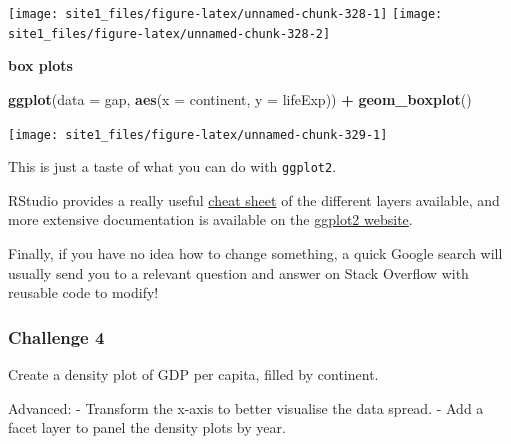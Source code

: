 \documentclass[]{book}
\newenvironment{Shaded}{\begin{snugshade}}{\end{snugshade}}
\newcommand{\KeywordTok}[1]{\textcolor[rgb]{0.13,0.29,0.53}{\textbf{#1}}}
\newcommand{\DataTypeTok}[1]{\textcolor[rgb]{0.13,0.29,0.53}{#1}}
\newcommand{\StringTok}[1]{\textcolor[rgb]{0.31,0.60,0.02}{#1}}
\newcommand{\OperatorTok}[1]{\textcolor[rgb]{0.81,0.36,0.00}{\textbf{#1}}}
\newcommand{\NormalTok}[1]{#1}
\begin{document}
\begin{center}\texttt{[image: site1\_files/figure-latex/unnamed-chunk-328-1]} \texttt{[image: site1\_files/figure-latex/unnamed-chunk-328-2]} \end{center}

\textbf{box plots}

\begin{Shaded}
\begin{Highlighting}[]
\KeywordTok{ggplot}\NormalTok{(}\DataTypeTok{data =}\NormalTok{ gap, }\KeywordTok{aes}\NormalTok{(}\DataTypeTok{x =}\NormalTok{ continent, }\DataTypeTok{y =}\NormalTok{ lifeExp)) }\OperatorTok{+}\StringTok{ }
\StringTok{  }\KeywordTok{geom_boxplot}\NormalTok{()}
\end{Highlighting}
\end{Shaded}

\begin{center}\texttt{[image: site1\_files/figure-latex/unnamed-chunk-329-1]} \end{center}

This is just a taste of what you can do with \texttt{ggplot2}.

RStudio provides a really useful
\href{https://www.rstudio.com/wp-content/uploads/2015/03/ggplot2-cheatsheet.pdf}{cheat
sheet} of the different layers available, and more extensive
documentation is available on the
\href{http://docs.ggplot2.org/current/}{ggplot2 website}.

Finally, if you have no idea how to change something, a quick Google
search will usually send you to a relevant question and answer on Stack
Overflow with reusable code to modify!

\subsubsection*{Challenge 4}\label{challenge-4}

Create a density plot of GDP per capita, filled by continent.

Advanced: - Transform the x-axis to better visualise the data spread. -
Add a facet layer to panel the density plots by year.
\end{document}
